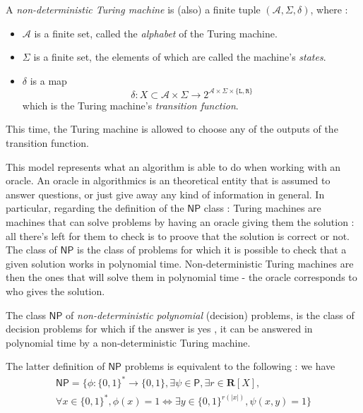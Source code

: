 \begin{definition}
    A \textit{non-deterministic Turing machine} is (also) a finite tuple \( (\mathcal A, \Sigma, \delta) \), where :
    \begin{itemize}
        \item $ \mathcal A $ is a finite set, called the \textit{alphabet} of the Turing machine.
        \item $ \Sigma $ is a finite set, the elements of which are called the machine's \textit{states}.
        \item $ \delta $ is a map
        \[
        \delta : X \subset \mathcal A \times \Sigma \to 2^{\mathcal A \times \Sigma \times \{ \texttt{L}, \texttt{R}\} }
        \]
        which is the Turing machine's \textit{transition function}.
    \end{itemize}
\end{definition}

This time, the Turing machine is allowed to \og choose \fg any of the outputs of the transition function.

This model represents what an algorithm is able to do when working with an oracle. An oracle in algorithmics is an theoretical entity that is assumed to answer questions, or just give away any kind of information in general. In particular, regarding the definition of the $ \mathsf{NP} $ class : Turing machines are machines that can solve problems by having an oracle giving them the solution : all there's left for them to check is to proove that the solution is correct or not. The class of $ \mathsf{NP} $ is the class of problems for which it is possible to check that a given solution works in polynomial time. Non-deterministic Turing machines are then the ones that will \og solve \fg them in polynomial time - the oracle corresponds to who gives the solution.

\begin{definition}[$ \mathsf{NP} $]
    The class $ \mathsf{NP} $ of \textit{non-deterministic polynomial} (decision) problems, is the class of decision problems for which if the answer is \og yes \fg, it can be answered in polynomial time by a non-deterministic Turing machine.
\end{definition}

\begin{proposition}
    The latter definition of $ \mathsf{NP} $ problems is equivalent to the following : we have
    \begin{multline*}
        \mathsf{NP} = \{ \phi : \{ 0,1 \}^* \to \{ 0,1 \}, \exists \psi \in \mathsf P, \exists r \in \mathbf R[X], \\
         \forall x \in \{ 0,1 \}^*, \phi(x) = 1 \iff \exists y \in \{ 0,1 \}^{r(|x|)}, \psi(x,y) = 1 \}
    \end{multline*}
\end{proposition}

